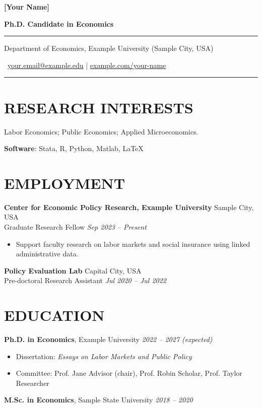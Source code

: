 \documentclass[11pt]{article}
\begin{document}
\centerline{\huge \bf [Your Name]}
\vspace{1mm}
\centerline{\Large \bf Ph.D. Candidate in Economics}
\vspace{1mm}
\hrule
\vspace{1mm}
\centerline{Department of Economics, Example University (Sample City, USA)}
\centerline{\faEnvelopeO \ \href{mailto:your.email@example.edu}{your.email@example.edu}
\quad | \quad \href{https://example.com/your-name}{example.com/your-name}}
\vspace{1mm}
\hrule

\section{{\Large R}ESEARCH INTERESTS}
Labor Economics; Public Economics; Applied Microeconomics.

\textbf{Software}: Stata, R, Python, Matlab, \LaTeX{}

\section{{\Large E}MPLOYMENT}
\textbf{Center for Economic Policy Research, Example University} \hfill Sample City, USA\\
Graduate Research Fellow \hfill \emph{Sep 2023 -- Present}
\begin{itemize}[leftmargin=*, label={}]
  \item Support faculty research on labor markets and social insurance using linked administrative data.
\end{itemize}

\textbf{Policy Evaluation Lab} \hfill Capital City, USA\\
Pre-doctoral Research Assistant \hfill \emph{Jul 2020 -- Jul 2022}

\section{{\Large E}DUCATION}
\textbf{Ph.D. in Economics}, Example University \hfill \emph{2022 -- 2027 (expected)}
\begin{itemize}[leftmargin=*, label={}]
  \item Dissertation: \textit{Essays on Labor Markets and Public Policy}
  \item Committee: Prof. Jane Advisor (chair), Prof. Robin Scholar, Prof. Taylor Researcher
\end{itemize}

\textbf{M.Sc. in Economics}, Sample State University \hfill \emph{2018 -- 2020}
\end{document}
